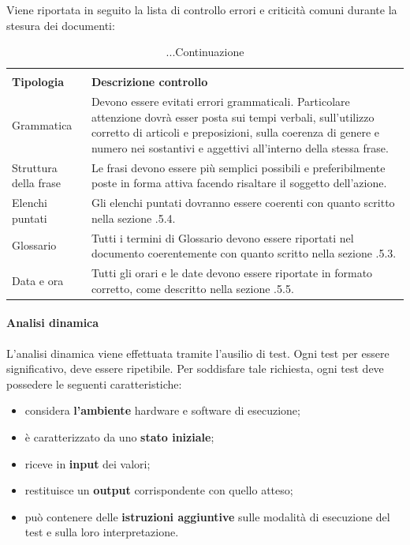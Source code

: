 \noindent Viene riportata in seguito la lista di controllo errori e criticità comuni durante la stesura dei documenti:

\renewcommand{\arraystretch}{2.2}

\begin{longtable}{|C{4cm}|C{8.5cm}|}
	\caption{Tabella per la lista di controllo}\\
	\textbf{Tipologia} & \textbf{Descrizione controllo}\\
	\endfirsthead

	\caption[]{...Continuazione}

	\endhead

	Grammatica & Devono essere evitati errori grammaticali. Particolare attenzione dovrà esser posta sui tempi verbali, sull'utilizzo corretto di articoli e preposizioni, sulla coerenza di genere e numero nei sostantivi e aggettivi all'interno della stessa frase. \\

	Struttura della frase & Le frasi devono essere più semplici possibili e preferibilmente poste in forma attiva facendo risaltare il soggetto dell'azione. \\

	Elenchi puntati & Gli elenchi puntati dovranno essere coerenti con quanto scritto nella sezione .5.4. \\

	Glossario & Tutti i termini di Glossario devono essere riportati nel documento coerentemente con quanto scritto nella sezione .5.3. \\

	Data e ora & Tutti gli orari e le date devono essere riportate in formato corretto, come descritto nella sezione .5.5. \\
	\hline
\end{longtable}



\paragraph{Analisi dinamica}
L'analisi dinamica viene effettuata tramite l'ausilio di test. Ogni test per essere significativo, deve essere ripetibile. Per soddisfare tale richiesta, ogni test deve possedere le seguenti caratteristiche:
\begin{itemize}
	\item considera \textbf{l'ambiente} hardware e software di esecuzione;
	\item è caratterizzato da uno \textbf{stato iniziale};
	\item riceve in \textbf{input} dei valori;
	\item restituisce un \textbf{output} corrispondente con quello atteso;
	\item può contenere delle \textbf{istruzioni aggiuntive} sulle modalità di esecuzione del test e sulla loro interpretazione.
\end{itemize}

